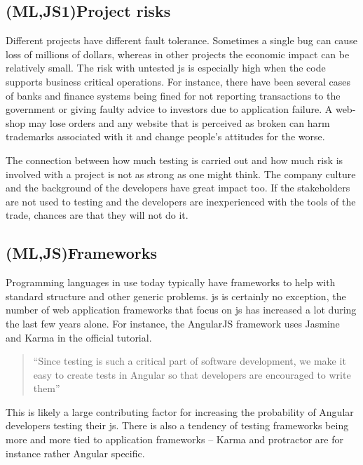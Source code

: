 \documentclass[11pt]{article}
\begin{document}
\subsection{(ML,JS1)Project risks}
\label{subsec:projectrisks}

Different projects have different fault tolerance. Sometimes a single bug can cause loss of millions of dollars, whereas in other projects the economic impact can be relatively small. The risk with untested \gls{js} is especially high when the code supports business critical operations. For instance, there have been several cases of banks and finance systems being fined for not reporting transactions to the government \cite{Bug1} or giving faulty advice to investors \cite{Bug2} due to application failure. A web-shop may lose orders and any website that is perceived as broken can harm trademarks associated with it and change people's attitudes for the worse.

The connection between how much testing is carried out and how much risk is involved with a project is not as strong as one might think. The company culture and the background of the developers have great impact too. If the stakeholders are not used to testing and the developers are inexperienced with the tools of the trade, chances are that they will not do it. \cite[question~14]{Ahnve}

\subsection{(ML,JS)Frameworks}
\label{subsec:angularjasminekarma}
\label{subsec:frameworks}
\label{subsec:tools}

Programming languages in use today typically have frameworks to help with standard structure and other generic problems. \gls{js} is certainly no exception, the number of web application frameworks that focus on \gls{js} has increased a lot during the last few years alone. For instance, the AngularJS framework uses Jasmine and Karma in the official tutorial.

\begin{quote}
``Since testing is such a critical part of software development, we make it easy to create tests in Angular so that developers are encouraged to write them'' \cite{AngularTemplates}
\end{quote}

This is likely a large contributing factor for increasing the probability of Angular developers testing their \gls{js}. There is also a tendency of testing frameworks being more and more tied to application frameworks -- Karma and protractor are for instance rather Angular specific.
\end{document}
